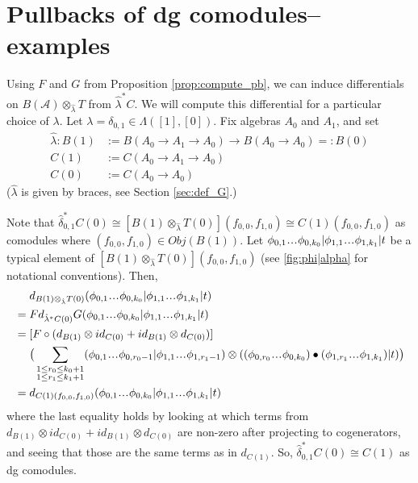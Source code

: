 \section{Pullbacks of dg comodules--examples}
%
\begin{eg} \label{eg:pb}
Using $F$ and $G$ from Proposition 
\ref{prop:compute_pb}, we can induce 
differentials on $B(\mathcal{A}) \otimes_{\hat{\lambda}} T$ from
$\hat{\lambda}^*C$. We will compute this differential 
for a particular choice of $\lambda$. 
Let $\lambda = \delta_{0,1} \in \Lambda([1], [0])$. 
Fix algebras $A_0$ and $A_1$, and set 
\begin{align*}
\hat{\lambda}: B(1) 
&:= B(A_0 \to A_1 \to A_0) \to 
  B(A_0 \to A_0) =: B(0)\\
C(1) 
&:= C(A_0 \to A_1 \to A_0)\\
C(0) 
&:= C(A_0 \to A_0)
\end{align*}
($\hat{\lambda}$ is given by braces, 
see Section \ref{sec:def_G}.)

Note that 
$\hat{\delta}_{0,1}^* C(0) \cong
[B(1) \otimes_{\hat{\lambda}} 
  T(0)](f_{0,0},f_{1,0}) \cong
C(1)(f_{0,0},f_{1,0})$ 
as comodules where 
$(f_{0,0},f_{1,0}) \in Obj(B(1))$. 
Let 
$\phi_{0,1} \smdots \phi_{0,k_0} |
\phi_{1,1} \smdots \phi_{1,k_1} |
t$ be a typical element of 
$[B(1) \otimes_{\hat{\lambda}} 
  T(0)](f_{0,0},f_{1,0})$
(see \ref{fig:phi|alpha} for notational 
conventions). Then,
\begin{align*}
& \phantom{{}={}}
d_{B(1) \otimes_{\hat{\lambda}} T(0)}
(\phi_{0,1} \smdots \phi_{0,k_0} |
\phi_{1,1} \smdots \phi_{1,k_1} | t)\\
&=
Fd_{\hat{\lambda}^*C(0)}G
(\phi_{0,1} \smdots \phi_{0,k_0} |
\phi_{1,1} \smdots \phi_{1,k_1} | t) \\
&=
[F \circ (d_{B(1)}\otimes id_{C(0)} + 
  id_{B(1)} \otimes d_{C(0)})] \\
& \phantom{{}=  {}}
\big( \sum \limits_{\substack{1 \leq r_0 \leq k_0+1 \\ 
1 \leq r_1 \leq k_1+1}}
(\phi_{0,1} \smdots \phi_{0,r_0-1} |
\phi_{1,1} \smdots \phi_{1,r_1-1} ) \otimes 
((\phi_{0,r_0}\smdots \phi_{0,k_0}) \bullet 
(\phi_{1,r_1}\smdots \phi_{1,k_1}) | t) \big) \\
&= 
d_{C(1)(f_{0,0},f_{1,0})}
(\phi_{0,1} \smdots \phi_{0,k_0} |
\phi_{1,1} \smdots \phi_{1,k_1} | t)
\end{align*}
where the last equality holds by looking at which 
terms from $d_{B(1)}\otimes id_{C(0)} + 
id_{B(1)} \otimes d_{C(0)}$ 
are non-zero after projecting to cogenerators, and 
seeing that those are the same terms as in 
$d_{C(1)}$. So, $\hat{\delta}_{0,1}^*C(0) \cong C(1)$ as 
dg comodules. 
\end{eg}
